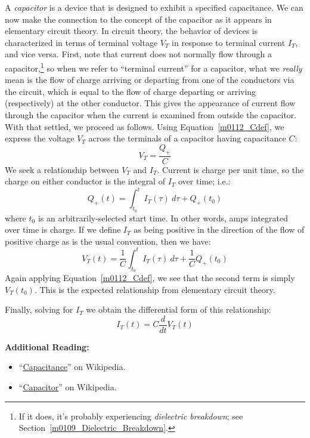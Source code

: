 A \emph{capacitor} is a device that is designed to exhibit a specified capacitance.
We can now make the connection to the concept of the capacitor as it appears in elementary circuit theory.
In circuit theory, the behavior of devices is characterized in terms of terminal voltage $V_T$ in response to terminal current $I_T$, and vice versa.
First, note that current does not normally flow through a capacitor,\footnote{If it does, it's probably experiencing \emph{dielectric breakdown}; see Section~\ref{m0109_Dielectric_Breakdown}.} so when we refer to ``terminal current'' for a capacitor, what we \emph{really} mean is the flow of charge arriving or departing from one of the conductors via the circuit, which is equal to the flow of charge departing or arriving (respectively) at the other conductor.  This gives the appearance of current flow through the capacitor when the current is examined from outside the capacitor.
With that settled, we proceed as follows.
Using Equation~\ref{m0112_Cdef}, we express the voltage $V_T$ across the terminals of a capacitor having capacitance $C$:
%
\begin{equation}
V_T = \frac{Q_+}{C}
\end{equation}
%
We seek a relationship between $V_T$ and $I_T$.
Current is charge per unit time, so the charge on either conductor is the integral of $I_T$ over time; i.e.:
%
\begin{equation}
Q_+(t) = \int_{t_0}^{t} { I_T(\tau)~d\tau } + Q_+(t_0)
\end{equation}
%
where $t_0$ is an arbitrarily-selected start time.
In other words, amps integrated over time is charge. If we define $I_T$ as being positive in the direction of the flow of positive charge as is the usual convention, then we have:
%
\begin{equation}
V_T(t) = \frac{1}{C}\int_{t_0}^{t} { I_T(\tau)~d\tau } + \frac{1}{C}Q_+(t_0)
\end{equation}
%
Again applying Equation~\ref{m0112_Cdef}, we see that the second term is simply $V_T(t_0)$.
This is the expected relationship from elementary circuit theory.

Finally, solving for $I_T$ we obtain the differential form of this relationship:
%
\begin{equation}
I_T(t) = C\frac{d}{dt}V_T(t)
\end{equation}



{\bf Additional Reading:}
\begin{itemize}
\item ``\href{https://en.wikipedia.org/wiki/Capacitance}{Capacitance}'' on Wikipedia.
\item ``\href{https://en.wikipedia.org/wiki/Capacitor}{Capacitor}'' on Wikipedia.
\end{itemize}

